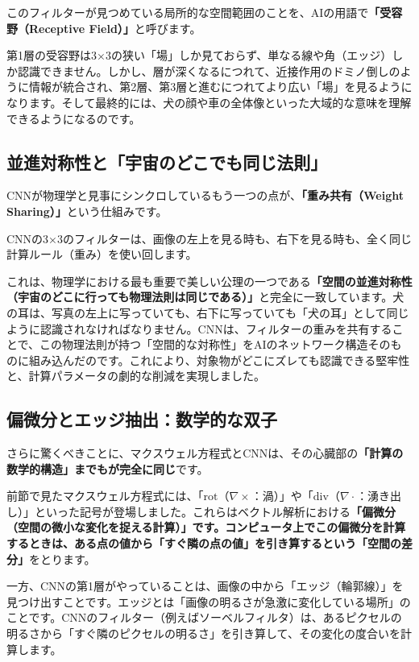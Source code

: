 このフィルターが見つめている局所的な空間範囲のことを、AIの用語で\textbf{「受容野（Receptive Field）」}と呼びます。

第1層の受容野は3×3の狭い「場」しか見ておらず、単なる線や角（エッジ）しか認識できません。しかし、層が深くなるにつれて、近接作用のドミノ倒しのように情報が統合され、第2層、第3層と進むにつれてより広い「場」を見るようになります。そして最終的には、犬の顔や車の全体像といった大域的な意味を理解できるようになるのです。

\subsection{並進対称性と「宇宙のどこでも同じ法則」}

CNNが物理学と見事にシンクロしているもう一つの点が、\textbf{「重み共有（Weight Sharing）」}という仕組みです。

CNNの3×3のフィルターは、画像の左上を見る時も、右下を見る時も、全く同じ計算ルール（重み）を使い回します。

これは、物理学における最も重要で美しい公理の一つである\textbf{「空間の並進対称性（宇宙のどこに行っても物理法則は同じである）」}と完全に一致しています。犬の耳は、写真の左上に写っていても、右下に写っていても「犬の耳」として同じように認識されなければなりません。CNNは、フィルターの重みを共有することで、この物理法則が持つ「空間的な対称性」をAIのネットワーク構造そのものに組み込んだのです。これにより、対象物がどこにズレても認識できる堅牢性と、計算パラメータの劇的な削減を実現しました。

\subsection{偏微分とエッジ抽出：数学的な双子}

さらに驚くべきことに、マクスウェル方程式とCNNは、その心臓部の\textbf{「計算の数学的構造」までもが完全に同じ}です。

前節で見たマクスウェル方程式には、「\(\mathrm{rot}\)（\(\nabla\times\)：渦）」や「\(\mathrm{div}\)（\(\nabla\cdot\)：湧き出し）」といった記号が登場しました。これらはベクトル解析における\textbf{「偏微分（空間の微小な変化を捉える計算）」です。コンピュータ上でこの偏微分を計算するときは、ある点の値から「すぐ隣の点の値」を引き算するという「空間の差分」}をとります。

一方、CNNの第1層がやっていることは、画像の中から「エッジ（輪郭線）」を見つけ出すことです。エッジとは「画像の明るさが急激に変化している場所」のことです。CNNのフィルター（例えばソーベルフィルタ）は、あるピクセルの明るさから「すぐ隣のピクセルの明るさ」を引き算して、その変化の度合いを計算します。


